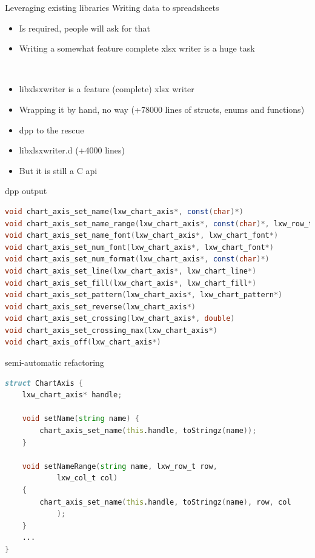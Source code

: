 \documentclass[aspectratio=169,notes]{beamer}
\begin{document}
	\begin{frame}{Leveraging existing libraries}
		Writing data to spreadsheets
		\begin{itemize}
			\item Is required, people will ask for that
			\item Writing a somewhat feature complete xlsx writer is a huge task
		\end{itemize}
		\mbox{}\\[1cm]
		\begin{itemize}
			\item libxlsxwriter is a feature (complete) xlsx writer
			\item Wrapping it by hand, no way (+78000 lines of structs, enums and functions)
			\item dpp to the rescue
			\item libxlsxwriter.d (+4000 lines)
			\item But it is still a C api
		\end{itemize}
	\end{frame}

	\begin{frame}[fragile]{dpp output}
		\begin{lstlisting}[language=D]
void chart_axis_set_name(lxw_chart_axis*, const(char)*)
void chart_axis_set_name_range(lxw_chart_axis*, const(char)*, lxw_row_t, lxw_col_t)
void chart_axis_set_name_font(lxw_chart_axis*, lxw_chart_font*)
void chart_axis_set_num_font(lxw_chart_axis*, lxw_chart_font*)
void chart_axis_set_num_format(lxw_chart_axis*, const(char)*)
void chart_axis_set_line(lxw_chart_axis*, lxw_chart_line*)
void chart_axis_set_fill(lxw_chart_axis*, lxw_chart_fill*)
void chart_axis_set_pattern(lxw_chart_axis*, lxw_chart_pattern*)
void chart_axis_set_reverse(lxw_chart_axis*)
void chart_axis_set_crossing(lxw_chart_axis*, double)
void chart_axis_set_crossing_max(lxw_chart_axis*)
void chart_axis_off(lxw_chart_axis*)
		\end{lstlisting}
	\end{frame}

	\begin{frame}[fragile]{semi-automatic refactoring}
		\begin{lstlisting}[language=D]
struct ChartAxis {
	lxw_chart_axis* handle;

	void setName(string name) { 
		chart_axis_set_name(this.handle, toStringz(name)); 
	}

	void setNameRange(string name, lxw_row_t row, 
			lxw_col_t col) 
	{
		chart_axis_set_name(this.handle, toStringz(name), row, col
			);
	}
	...
}
		\end{lstlisting}
	\end{frame}
\end{document}
